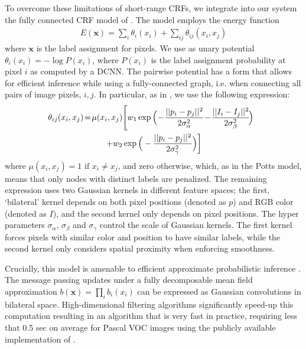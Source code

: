 To overcome these limitations of short-range CRFs, we integrate into our system
the fully connected CRF model of \cite{krahenbuhl2011efficient}. The model
employs the energy function
\begin{align}
  E(\boldsymbol{x}) = \sum_i \theta_i(x_i) + \sum_{ij} \theta_{ij}(x_i, x_j)
\end{align}
where $\boldsymbol{x}$ is the label assignment for pixels. We use as unary
potential $\theta_i(x_i) = - \log P(x_i)$, where $P(x_i)$ is the label
assignment probability at pixel $i$ as computed by a DCNN. The pairwise
potential has a form that allows for efficient inference while using a fully-connected graph, i.e.
when  connecting 
all pairs of image pixels, $i,j$. In particular, as in \cite{krahenbuhl2011efficient},  we use the following expression:
\begin{gather}
 \hspace{-.2cm}\theta_{ij}(x_i, x_j) \!=\! \mu(x_i,x_j)\!\left[w_1 \exp \Big(\!-\!\frac{||p_i-p_j||^2}{2\sigma_\alpha^2} \!-\!\frac{||I_i-I_j||^2}{2\sigma_\beta^2}\! \Big)\right. \nonumber\\
\left. + w_2 \exp \Big(-\frac{||p_i-p_j||^2}{2\sigma_\gamma^2}\Big)\right]\label{eq:fully_crf}
\end{gather}
where
$\mu(x_i,x_j)= 1 \text{ if } x_i \neq x_j$, and zero otherwise, which, as in the Potts model, means that only nodes with distinct labels are penalized.  The remaining expression uses two Gaussian kernels in different feature spaces; the first, `bilateral' kernel
depends on both pixel positions (denoted as $p$) and
RGB color (denoted as $I$), and the second kernel only depends on pixel
positions. The hyper parameters $\sigma_\alpha$, $\sigma_\beta$ and
$\sigma_\gamma$ control the scale of Gaussian kernels. The  first kernel forces pixels with similar color and position to have similar labels, while the second kernel only considers spatial proximity when enforcing smoothness. 


Crucially, this model is amenable to efficient approximate probabilistic
inference \cite{krahenbuhl2011efficient}. The message passing updates under a
fully decomposable mean field approximation $b(\boldsymbol{x}) = \prod_i
b_i(x_i)$ can be expressed as Gaussian convolutions in bilateral
space. High-dimensional filtering algorithms \cite{adams2010fast}
significantly speed-up this computation resulting in an algorithm that is very
fast in practice, requiring less that 0.5 sec on average for Pascal VOC images using the
publicly available implementation of \cite{krahenbuhl2011efficient}.

